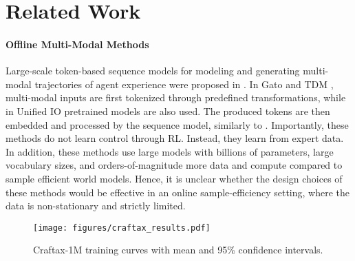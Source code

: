 \section{Related Work}
\paragraph{Offline Multi-Modal Methods}
Large-scale token-based sequence models for modeling and generating multi-modal trajectories of agent experience were proposed in \cite{lu2023unifiedio, Lu_2024_CVPR, reed2022a, schubert2023generalist}.
In Gato \cite{reed2022a} and TDM \cite{schubert2023generalist}, multi-modal inputs are first tokenized through predefined transformations, while in Unified IO \cite{lu2023unifiedio, Lu_2024_CVPR} pretrained models are also used.
The produced tokens are then embedded and processed by the sequence model, similarly to \AlgName{}.
Importantly, these methods do not learn control through RL.
Instead, they learn from expert data.
In addition, these methods use large models with billions of parameters, large vocabulary sizes, and orders-of-magnitude more data and compute compared to sample efficient world models.
Hence, it is unclear whether the design choices of these methods would be effective in an online sample-efficiency setting, where the data is non-stationary and strictly limited.



\begin{figure}[t]
    \centering
    \texttt{[image: figures/craftax\_results.pdf]}
    \caption{Craftax-1M training curves with mean and 95\% confidence intervals. }
    \label{fig:craftax-main-results}
\end{figure}





